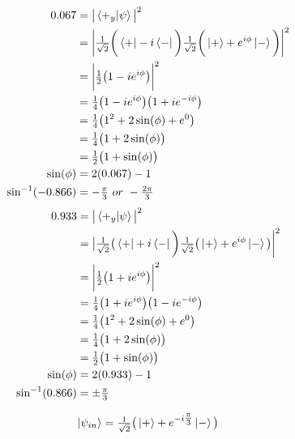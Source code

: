 \documentclass[paper=a4, fontsize=11pt]{scrartcl} %
\numberwithin{equation}{section} %
\numberwithin{figure}{section} %
\numberwithin{table}{section} %
\begin{document}
\begin{multicols}{2}
\noindent
\begin{align*}
0.067 & = \big | \braket{+_y| \psi}  \big |^2 \\
 & = \bigg |  \tfrac{1}{\sqrt{2}} \bigg ( \bra{+} -i \bra{-} \bigg ) \tfrac{1}{\sqrt{2}} \bigg ( \ket{+}  + e^{i\phi}\ket{-} \bigg )  \bigg |^2 \\
& = \bigg | \tfrac{1}{2} \big ( 1 - ie^{i\phi}  \big )  \bigg|^2 \\
& = \tfrac{1}{4} \big ( 1 - ie^{i\phi}  \big ) \big ( 1 + ie^{-i\phi}   \big ) \\
& = \tfrac{1}{4} \big (  1^2 + 2\sin(\phi) + e^0 \big ) \\
& = \tfrac{1}{4} \big ( 1+ 2\sin(\phi) \big ) \\
& = \tfrac{1}{2} \big (  1 + \sin(\phi) \big ) \\
\sin(\phi) & = 2(0.067) - 1 \\
\sin^{-1}(-0.866) & = - \tfrac{\pi}{3 } \ or\ -\tfrac{2\pi}{3}
\end{align*}
\begin{align*}
0.933 & = \big | \braket{+_y| \psi}  \big |^2 \\
 & = \big |  \tfrac{1}{\sqrt{2}} \big ( \bra{+} +i \bra{-} \bigg ) \tfrac{1}{\sqrt{2}} \big ( \ket{+}  + e^{i\phi}\ket{-} \big )  \bigg |^2 \\
& = \bigg | \tfrac{1}{2} \big ( 1 + ie^{i\phi}  \big )  \bigg|^2 \\
& = \tfrac{1}{4} \big ( 1 + ie^{i\phi}  \big ) \big ( 1 - ie^{-i\phi}   \big ) \\
& = \tfrac{1}{4} \big (  1^2 + 2\sin(\phi) + e^0 \big ) \\
& = \tfrac{1}{4} \big ( 1+ 2\sin(\phi) \big ) \\
& = \tfrac{1}{2} \big (  1 + \sin(\phi) \big ) \\
\sin(\phi) & = 2(0.933) - 1 \\
\sin^{-1}(0.866) & = \pm \tfrac{\pi}{3 } \ 
\end{align*}
\end{multicols}
\begin{equation*}
\ket{\psi_{in}} = \tfrac{1}{\sqrt{2}} \big ( \ket{+} + e^{-i\tfrac{\pi}{3}} \ket{-} \big )
\end{equation*}
\end{document}

